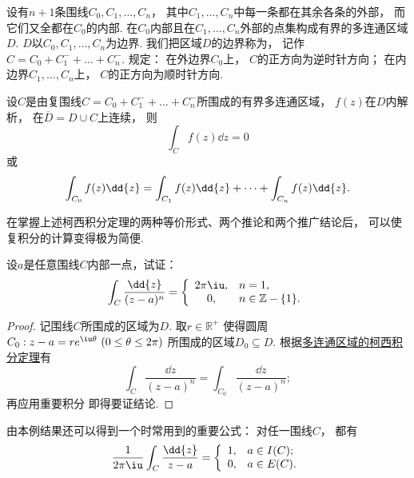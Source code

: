 \begin{definition}
设有\(n+1\)条围线\(C_0,C_1,\dots,C_n\)，
其中\(C_1,\dots,C_n\)中每一条都在其余各条的外部，
而它们又全都在\(C_0\)的内部.
在\(C_0\)内部且在\(C_1,\dots,C_n\)外部的点集构成有界的多连通区域\(D\).
\(D\)以\(C_0,C_1,\dots,C_n\)为边界.
我们把区域\(D\)的边界称为，
记作\(C=C_0+C_1^-+\dots+C_n^-\).
规定：
在外边界\(C_0\)上，
\(C\)的正方向为逆时针方向；
在内边界\(C_1,\dots,C_n\)上，
\(C\)的正方向为顺时针方向.
\end{definition}

\begin{theorem}[多连通区域的柯西积分定理]\label{theorem:解析函数的积分表示.多连通区域的柯西积分定理}
设\(C\)是由复围线\(C=C_0+C_1^-+\dots+C_n^-\)所围成的有界多连通区域，
\(f(z)\)在\(D\)内解析，
在\(\overline{D}=D \cup C\)上连续，
则\begin{equation*}
	\int_C f(z) \dd{z} = 0
\end{equation*}或\begin{equation}
	\def\Ic#1{\int_{C_{#1}} f(z) \dd{z}}
	\Ic{0} = \Ic{1} + \dots + \Ic{n}.
\end{equation}
\end{theorem}

在掌握上述柯西积分定理的两种等价形式、两个推论和两个推广结论后，
可以使复积分的计算变得极为简便.

\begin{example}
设\(a\)是任意围线\(C\)内部一点，试证：\begin{equation*}
	\int_C \frac{\dd{z}}{(z-a)^n}
	= \left\{ \begin{array}{cl}
		2\pi\iu, & n=1, \\
		0, & n\in\mathbb{Z}-\{1\}.
	\end{array} \right.
\end{equation*}
\begin{proof}
记围线\(C\)所围成的区域为\(D\).
取\(r\in\mathbb{R}^+\)
使得圆周\(C_0: z - a = r e^{\iu\theta}\ (0 \leq \theta \leq 2\pi)\)
所围成的区域\(D_0 \subseteq D\).
根据\hyperref[theorem:解析函数的积分表示.多连通区域的柯西积分定理]{多连通区域的柯西积分定理}有\begin{equation*}
	\int_C \frac{\dd{z}}{(z-a)^n} = \int_{C_0} \frac{\dd{z}}{(z-a)^n};
\end{equation*}
再应用重要积分  即得要证结论.
\end{proof}
\end{example}
由本例结果还可以得到一个时常用到的重要公式：
对任一围线\(C\)，
都有\begin{equation}\label{equation:解析函数的积分表示.重要积分2}
	\frac{1}{2\pi\iu}
	\int_C \frac{\dd{z}}{z-a}
	= \left\{ \begin{array}{ll}
		1, & a \in I(C); \\
		0, & a \in E(C).
	\end{array} \right.
\end{equation}

